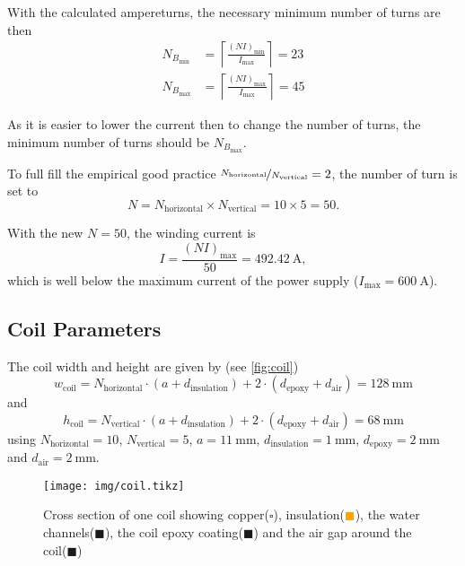 \documentclass[10pt,a4paper,noendnumber=true]{scrartcl}
\begin{document}
With the calculated ampereturns, the necessary minimum number of turns are then
\begin{align}
    N_{B_\text{min}} &= \left\lceil\frac{(NI)_\text{min}}{I_\text{max}}\right\rceil = 23\\
    N_{B_\text{max}} &= \left\lceil\frac{(NI)_\text{max}}{I_\text{max}}\right\rceil = 45
\end{align}

As it is easier to lower the current then to change the number of turns, the minimum number of turns should be $N_{B_\text{max}}$.

To full fill the empirical good practice $\nicefrac{N_\text{horizontal}}{N_\text{vertical}}=2$, the number of turn is set to
\begin{equation}
    N=N_\text{horizontal} \times N_\text{vertical} = 10 \times 5 = 50.
\end{equation}

With the new $N=50$, the winding current is
\begin{equation}
    I = \frac{(NI)_\text{max}}{50} = \SI{492.42}{\ampere},
\end{equation}
which is well below the maximum current of the power supply ($I_\text{max}=\SI{600}{\ampere}$).

\subsection{Coil Parameters}
The coil width and height are given by (see \autoref{fig:coil})
\begin{equation}
    w_\text{coil}=N_\text{horizontal} \cdot (a+d_\text{insulation}) + 2\cdot(d_\text{epoxy} + d_\text{air}) = \SI{128}{\mm}
\end{equation}
and
\begin{equation}
    h_\text{coil}=N_\text{vertical} \cdot (a+d_\text{insulation}) + 2\cdot(d_\text{epoxy} + d_\text{air}) = \SI{68}{\mm}
\end{equation}
using $N_\text{horizontal}=10$, $N_\text{vertical}=5$, $a=\SI{11}{\mm}$, $d_\text{insulation}=\SI{1}{\mm}$, $d_\text{epoxy}=\SI{2}{\mm}$ and $d_\text{air}=\SI{2}{\mm}$.

\begin{figure}[H]
\centering
\texttt{[image: img/coil.tikz]}
\caption{Cross section of one coil showing copper(\textcolor{black}{$\square$}), insulation(\textcolor{orange}{$\blacksquare$}), 
the water channels(\textcolor{blue!30}{$\blacksquare$}),
the coil epoxy coating(\textcolor{red!30}{$\blacksquare$}) and
the air gap around the coil(\textcolor{green!30}{$\blacksquare$})}
\label{fig:coil}
\end{figure}
\end{document}
